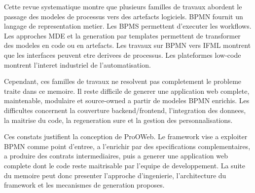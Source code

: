 \documentclass[12pt,a4paper]{article}
\begin{document}
Cette revue systematique montre que plusieurs familles de travaux abordent le passage des modeles de processus vers des artefacts logiciels. BPMN fournit un langage de representation metier. Les BPMS permettent d'executer les workflows. Les approches MDE et la generation par templates permettent de transformer des modeles en code ou en artefacts. Les travaux sur BPMN vers IFML montrent que les interfaces peuvent etre derivees de processus. Les plateformes low-code montrent l'interet industriel de l'automatisation.

Cependant, ces familles de travaux ne resolvent pas completement le probleme traite dans ce memoire. Il reste difficile de generer une application web complete, maintenable, modulaire et source-owned a partir de modeles BPMN enrichis. Les difficultes concernent la couverture backend/frontend, l'integration des donnees, la maitrise du code, la regeneration sure et la gestion des personnalisations.

Ces constats justifient la conception de ProOWeb. Le framework vise a exploiter BPMN comme point d'entree, a l'enrichir par des specifications complementaires, a produire des contrats intermediaires, puis a generer une application web complete dont le code reste maitrisable par l'equipe de developpement. La suite du memoire peut donc presenter l'approche d'ingenierie, l'architecture du framework et les mecanismes de generation proposes.
\end{document}
